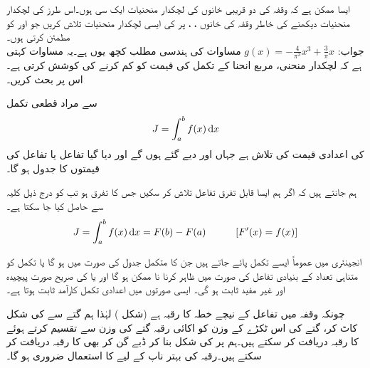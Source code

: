 ایسا ممکن ہے کہ  وقفہ  کی دو قریبی خانوں کی لچکدار منحنیات ایک سی  ہوں۔اس طرز کی لچکدار منحنیات دیکھنے کی خاطر وقفہ 
 کی  خانوں ، ،  پر  کی ایسی لچکدار منحنیات تلاش کریں جو  اور  کو مطمئن کرتی ہوں۔\\
جواب:\quad
$g(x)=-\tfrac{4}{\pi^3}x^3+\tfrac{3}{\pi}x$
\quad
مساوات  کی ہندسی مطلب کچھ یوں ہے۔یہ مساوات کہتی ہے کہ لچکدار منحنی، مربع انحنا کے تکمل کی قیمت کو کم کرنے کی کوشش کرتی ہے۔اس پر بحث کریں۔ 

 سے مراد قطعی تکمل
\begin{align}
J=\int_a^b f(x)\dif x
\end{align}
کی اعدادی قیمت  کی تلاش ہے جہاں  اور  دیے گئے ہوں گے اور  دیا گیا تفاعل یا تفاعل کی قیمتوں کا جدول ہو گا۔

ہم جانتے ہیں کہ اگر ہم ایسا قابل تفرق تفاعل  تلاش کر سکیں جس کا تفرق  ہو تب  کو درج ذیل کلیہ سے حاصل کیا جا سکتا ہے۔
\begin{align*}
J=\int_a^b f(x)\dif x=F(b)-F(a)\quad \quad \quad [F'(x)=f(x)]
\end{align*}

انجینئری میں عموماً ایسے تکمل پائے جاتے ہیں جن کا متکمل جدول کی صورت میں ہو گا یا تکمل کو متناہی تعداد کے بنیادی تفاعل کی صورت میں ظاہر کرنا نا ممکن ہو گا اور یا  کی صریح صورت پیچیدہ اور غیر مفید ثابت ہو گی۔ ایسی صورتوں میں اعدادی تکمل کارآمد ثابت ہوتا ہے۔

چونکہ  وقفہ  میں تفاعل  کے نیچے خطہ  کا رقبہ  ہے (شکل ) لہٰذا ہم گتے سے  کی شکل کاٹ کر، گتے کی اس ٹکڑے کے وزن کو اکائی رقبہ گتے کی وزن سے تقسیم کرتے ہوئے  کا رقبہ دریافت کر سکتے ہیں۔ہم   پر  کی شکل بنا کر ڈبے گن  کر بھی  کا رقبہ دریافت کر سکتے ہیں۔رقبہ کی بہتر ناپ کے لیے   کا استعمال ضروری ہو گا۔

